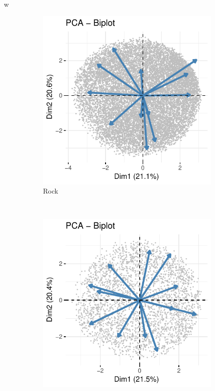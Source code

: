 w\documentclass[11pt, oneside]{article}
\begin{document}
\begin{figure}[h!]
\begin{subfigure}[b]{0.5\textwidth}
        \includegraphics[width=\textwidth]{rock_bipl.pdf} 
        \caption{Rock}
    \end{subfigure} \\
    \begin{subfigure}[b]{0.5\textwidth}
        \includegraphics[width=\textwidth]{folk_bipl.pdf} 

\end{subfigure}
\end{figure}
\end{document}
